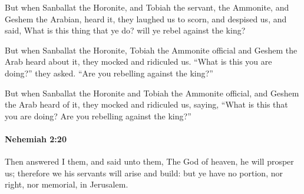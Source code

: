			\begin{versebox}
					\item[BHS] 
					\item[LXX] 
					\item[ASV] But when Sanballat the Horonite, and Tobiah the servant, the Ammonite, and Geshem the Arabian, heard it, they laughed us to scorn, and despised us, and said, What is this thing that ye do? will ye rebel against the king?
					\item[NIV] But when Sanballat the Horonite, Tobiah the Ammonite official and Geshem the Arab heard about it, they mocked and ridiculed us. “What is this you are doing?” they asked. “Are you rebelling against the king?”
					\item[NRSV] But when Sanballat the Horonite and Tobiah the Ammonite official, and Geshem the Arab heard of it, they mocked and ridiculed us, saying, “What is this that you are doing? Are you rebelling against the king?”
			\end{versebox}

		\paragraph{Nehemiah 2:20} %
			\label{NEHEMIAH-2-20}

			Then answered I them, and said unto them, The God of heaven, he will prosper us; therefore we his servants will arise and build: but ye have no portion, nor right, nor memorial, in Jerusalem.

